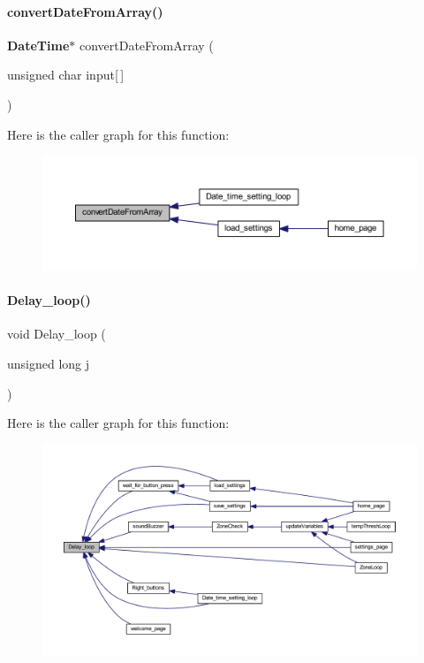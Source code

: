 \paragraph{convert\+Date\+From\+Array()}
{\footnotesize\ttfamily \textbf{ Date\+Time}$\ast$ convert\+Date\+From\+Array (\begin{DoxyParamCaption}\item[{unsigned char}]{input[$\,$] }\end{DoxyParamCaption})}

Here is the caller graph for this function\+:
\nopagebreak
\begin{figure}[H]
\begin{center}
\leavevmode
\includegraphics[width=350pt]{a00020_abbe3f18b8a8d4112e5d5f3d1764ccabf_icgraph}
\end{center}
\end{figure}
\mbox{\label{a00020_a4ac586173db65fe258489805cd2a50a7}} 
\paragraph{Delay\+\_\+loop()}
{\footnotesize\ttfamily void Delay\+\_\+loop (\begin{DoxyParamCaption}\item[{unsigned long}]{j }\end{DoxyParamCaption})}

Here is the caller graph for this function\+:
\nopagebreak
\begin{figure}[H]
\begin{center}
\leavevmode
\includegraphics[width=350pt]{a00020_a4ac586173db65fe258489805cd2a50a7_icgraph}
\end{center}
\end{figure}
\mbox{\label{a00020_a8ac785f2d4c8d133c61c4e9be06cb606}} 
